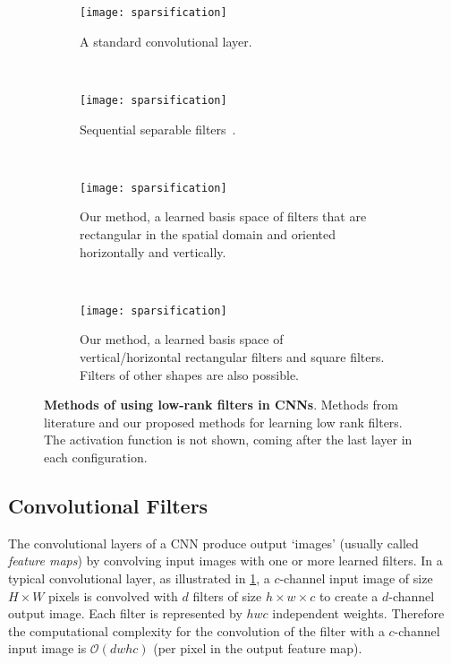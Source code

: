 \documentclass[thesis]{subfiles}
\begin{document}
    \begin{figure}[tbp] 
        \begin{subfigure}[b]{0.98\textwidth}
            \centering
            \texttt{[image: sparsification]}
            \caption{A standard convolutional layer.}\label{fig:fullrank}
        \end{subfigure}\\
        \begin{subfigure}[b]{0.98\textwidth}
            \centering
            \texttt{[image: sparsification]}
            \caption{Sequential separable filters~\citep{journals/corr/JaderbergVZ14}.}\label{fig:separableseq}
        \end{subfigure}\\
        \begin{subfigure}[b]{0.98\textwidth}
            \centering
            \texttt{[image: sparsification]}
            \caption{Our method, a learned basis space of filters that are rectangular in the spatial domain and oriented horizontally and vertically.}\label{fig:ourmethod}
        \end{subfigure}\\
        \begin{subfigure}[b]{0.98\textwidth}
            \centering
            \texttt{[image: sparsification]}
            \caption{Our method, a learned basis space of vertical/horizontal rectangular filters and square filters. Filters of other shapes are also possible.}\label{fig:ourmethodfullrank}
        \end{subfigure}
        \caption[Overview of methods of using low-rank filters]{\textbf{Methods of using low-rank filters in CNNs}. Methods from literature and our proposed methods for learning low rank filters. The activation function is not shown, coming after the last layer in each configuration.}\label{fig:separablemethods}
    \end{figure}
    
    \subsection{Convolutional Filters}
    
    The convolutional layers of a CNN produce output `images' (usually called {\em feature maps}) by convolving input images with one or more learned filters. %
    In a typical convolutional layer, as illustrated in \cref{fig:fullrank}, a $c$-channel input image of size $H \times W$ pixels is convolved with $d$ filters of size $h \times w \times c$ to create a $d$-channel output image. Each filter is represented by $h w c$ independent weights. Therefore the computational complexity for the convolution of the filter with a $c$-channel input image is $\mathcal{O}(d w h c)$ (per pixel in the output feature map).
    
\end{document}
